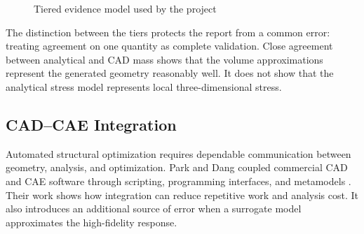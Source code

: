 \begin{figure}[H]
\centering
{}
\caption{Tiered evidence model used by the project}
\label{fig:tiered-evidence}
\end{figure}

The distinction between the tiers protects the report from a common error:
treating agreement on one quantity as complete validation. Close agreement
between analytical and CAD mass shows that the volume approximations represent
the generated geometry reasonably well. It does not show that the analytical
stress model represents local three-dimensional stress.

\subsection{CAD--CAE Integration}
\label{sec:cad-cae-review}

Automated structural optimization requires dependable communication between
geometry, analysis, and optimization. Park and Dang coupled commercial CAD and
CAE software through scripting, programming interfaces, and metamodels
\cite{park2010}. Their work shows how integration can reduce repetitive work
and analysis cost. It also introduces an additional source of error when a
surrogate model approximates the high-fidelity response.

